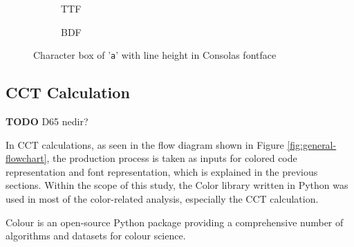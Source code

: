 \documentclass{article}
\begin{document}

\begin{figure}[htbp]
  \begin{subfigure}{0.48\textwidth}
    \centering
    

    \caption{TTF}
    \label{fig:charbox_TTF}
  \end{subfigure}
  \begin{subfigure}{0.48\textwidth}
    \centering

    \caption{BDF}
    \label{fig:charbox_BDF}
  \end{subfigure}

  \caption{Character box of '\texttt{a}' with line height in Consolas fontface}
  \label{fig:charbox}
\end{figure}

\subsection{CCT Calculation}

\textbf{TODO} D65 nedir?

In CCT calculations, as seen in the flow diagram shown in Figure  \ref{fig:general-flowchart}, the production process is taken as inputs for colored code representation and font representation, which is explained in the previous sections. Within the scope of this study, the Color library \cite{colour2022package} written in Python was used in most of the color-related analysis, especially the CCT calculation.

Colour is an open-source Python package providing a comprehensive number of algorithms and datasets for colour science.
\end{document}
